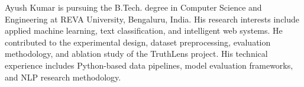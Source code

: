 \documentclass[journal]{IEEEtran}
\begin{document}
\begin{IEEEbiographynophoto}{Ayush Kumar}
is pursuing the B.Tech. degree in Computer Science and Engineering at REVA University,
Bengaluru, India. His research interests include applied machine learning, text
classification, and intelligent web systems. He contributed to the experimental design,
dataset preprocessing, evaluation methodology, and ablation study of the TruthLens
project. His technical experience includes Python-based data pipelines, model evaluation
frameworks, and NLP research methodology.
\end{IEEEbiographynophoto}
\end{document}
